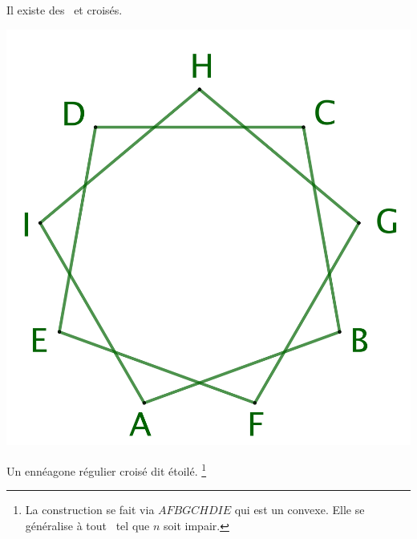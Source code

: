 \begin{remark}
	Il existe des \nregs\ et croisés.


    \vspace{-1.5em}
    
    \begin{multicols}{2}
    	\small\itshape\centering
    	
	    \null\vfill

	    \includegraphics[scale=.175]{content/polygon/def/9-iso-non-conv.png}
    
        \smallskip
        Un ennéagone régulier croisé dit étoilé.%
	    \footnote{
	        La construction se fait via $AFBGCHDIE$ qui est un  convexe. Elle se généralise à tout \nreg\ tel que $n$ soit impair.
	    }


    	\columnbreak
	
	    \null\vfill
	    

\end{multicols}
\end{remark}
